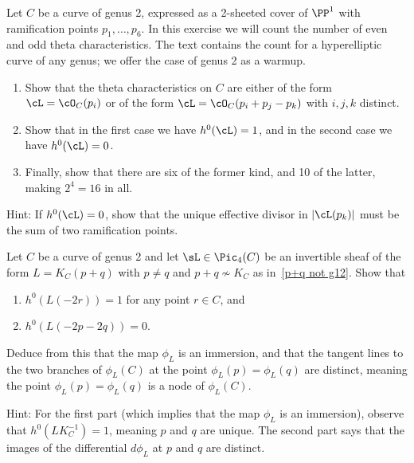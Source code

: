 \begin{exercise}
\label{theta char on genus 2}
 Let $C$ be a curve of genus 2, expressed as a 2-sheeted cover of $\PP^1$
 with ramification points $p_1,\dots,p_6$. In this exercise we will
 count the number of
 even and odd theta characteristics.
The text contains the count for a hyperelliptic curve of any genus;
we offer
the case of genus 2 as a warmup.
 \begin{enumerate}
 \item Show that the theta characteristics on $C$ are either of the
 form $\cL = \cO_C(p_i)$ or of the form $\cL = \cO_C(p_i + p_j - p_k)$
 with $i, j, k$ distinct.
 \item Show that in the first case we have $h^0(\cL) = 1$, and in the
 second case we have $h^0(\cL) = 0$.
 \item Finally, show that there are six of the former kind, and 10 of
 the latter, making $2^4 = 16$ in all.
 \end{enumerate}

 Hint: If $h^0(\cL) = 0$, 
show that  the unique effective divisor in
 $|\cL(p_k)|$ must be the sum of two ramification points.
 \end{exercise}

\begin{exercise}
\label{nodal quartic}
Let $C$ be a  curve of genus 2 and let $\sL\in \Pic_4(C)$ be an invertible
sheaf of the form $L = K_C(p+q)$ with $p \neq q$ and $p+q \not\sim K_C$
as in~\ref{p+q not g12}. Show that
\begin{enumerate}
\item $h^0(L(-2r))= 1$ for any point $r \in C$, and
\item $h^0(L(-2p-2q)) = 0$.
\end{enumerate}
Deduce from this that the map $\phi_L$ is an immersion, and that the
tangent lines to the two branches of $\phi_L(C)$ at the point $\phi_L(p)
= \phi_L(q)$ are distinct, meaning the point $\phi_L(p) = \phi_L(q)$
is a node of $\phi_L(C)$.

Hint: For the first part (which implies that the map $\phi_L$ is an
immersion), observe that $h^0(LK_C^{-1}) = 1$, meaning $p$ and $q$
are unique. The second part says that the images of the differential
$d\phi_L$ at $p$ and $q$ are distinct.
\end{exercise}


